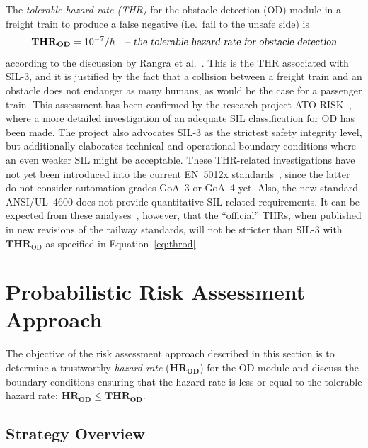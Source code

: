 \documentclass[runningheads,a4paper]{llncs}
\begin{document}
 

The \emph{tolerable hazard rate (THR)} for the obstacle detection (OD) module in a freight train 
to produce a false negative (i.e.~fail to the unsafe side)
is   
\begin{equation}\label{eq:throd}
   \mathbf{THR}_\mathbf{OD} = 10^{-7}/h \quad\text{\sl -- the tolerable hazard rate for obstacle detection}
\end{equation} 
according to the discussion by Rangra et al.~\cite{rangra_analyse_2018}. This is the THR associated with   SIL-3, and it is justified by the fact that a collision between a freight train and an obstacle does not endanger as many humans, as would be the case for a passenger train. This assessment has been confirmed by the research project ATO-RISK~\cite{braband_risk_2023}, where a more detailed investigation of an adequate SIL classification for OD has been made. The project also advocates SIL-3 as the strictest safety integrity level, but additionally elaborates technical and operational boundary conditions where an even weaker SIL might be acceptable. These THR-related investigations have not yet been introduced into the current EN~5012x standards~\cite{CENELEC50126,CENELEC50126-2,CENELEC50128,CENELEC50129}, since the latter  do not consider automation grades GoA~3 or GoA~4 yet. Also, the new standard ANSI/UL~4600\xspace does not provide quantitative SIL-related requirements. It can be expected from these analyses~\cite{rangra_analyse_2018,braband_risk_2023}, however, that the ``official'' THRs, when published in new revisions of the   railway  standards, will not be stricter   
than  SIL-3 with $\mathbf{THR}_\text{OD}$ as specified in Equation~\eqref{eq:throd}. 

\section{Probabilistic Risk Assessment Approach}\label{sec:riskmodellingapproach}

The objective of the risk assessment approach described in this section is to determine a trustworthy
\emph{hazard rate} ($\mathbf{HR}_\mathbf{OD}$) for the OD module and discuss the boundary conditions ensuring that the hazard rate is less or equal to the tolerable hazard rate:
$\mathbf{HR}_\mathbf{OD} \le  \mathbf{THR}_\mathbf{OD}$.

\subsection{Strategy Overview}
\end{document}
